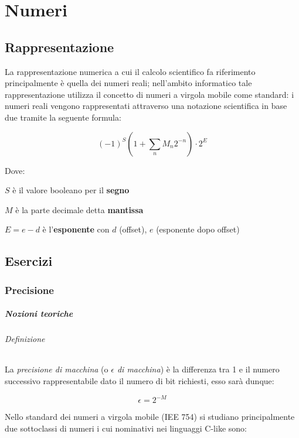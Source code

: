 \setchapterpreamble[u]{\margintoc}
\chapter{Numeri}

\section{Rappresentazione}

La rappresentazione numerica a cui il calcolo scientifico fa riferimento principalmente
è quella dei numeri reali; nell’ambito informatico tale rappresentazione utilizza
il concetto di numeri a virgola mobile come standard: i numeri reali vengono
rappresentati attraverso una notazione scientifica in base due tramite la seguente formula:

$$
	(-1)^S \left( 1 + \sum_n M_n 2^{-n} \right) \cdot 2^{E}
$$

Dove:
\begin{description}
	\item $S$ è il valore booleano per il \textbf{segno}
	\item $M$ è la parte decimale detta \textbf{mantissa}

	\item $E = e - d$ è l'\textbf{esponente} con $d$ (offset), $e$ (esponente dopo offset)
\end{description}

\section{Esercizi}

\subsection{Precisione}

\paragraph{Nozioni teoriche}

\subparagraph{Definizione} La \textit{precisione di macchina} (o \textit{$\epsilon$ di macchina})
è la differenza tra 1 e il numero successivo rappresentabile dato il numero di bit
richiesti, esso sarà dunque:

$$
	\epsilon = 2^{-M}
$$

Nello standard dei numeri a virgola mobile (IEE 754) si studiano principalmente
due sottoclassi di numeri i cui nominativi nei linguaggi C-like sono:

